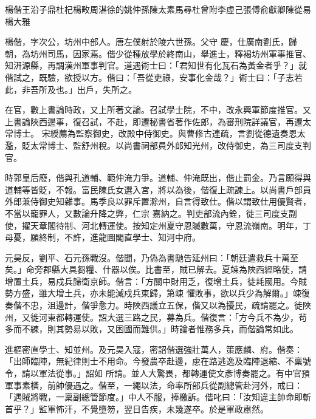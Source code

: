 
\begin{pinyinscope}

 楊偕王沿子鼎杜杞楊畋周湛徐的姚仲孫陳太素馬尋杜曾附李虛己張傅俞獻卿陳從易楊大雅



 楊偕，字次公，坊州中部人。唐左僕射於陵六世孫。父守
 慶，仕廣南劉氏，歸朝，為坊州司馬，因家焉。偕少從種放學於終南山，舉進士，釋褐坊州軍事推官、知汧源縣，再調漢州軍事判官。道遇術士曰：「君知世有化瓦石為黃金者乎？」就偕試之，既驗，欲授以方。偕曰：「吾從吏祿，安事化金哉？」術士曰：「子志若此，非吾所及也。」出戶，失所之。



 在官，數上書論時政，又上所著文論。召試學士院，不中，改永興軍節度推官。又上書論陜西邊事，復召試，不赴，即遷秘書省著作佐郎，為審刑院詳議官，再遷太常博士。
 宋綬薦為監察御史，改殿中侍御史。與曹修古連疏，言劉從德遺奏恩太濫，貶太常博士、監舒州稅。以尚書祠部員外郎知光州，改侍御史，為三司度支判官。



 時郭皇后廢，偕與孔道輔、範仲淹力爭。道輔、仲淹既出，偕止罰金。乃言願得與道輔等皆貶，不報。富民陳氏女選入宮，將以為後，偕復上疏諫上。以尚書戶部員外郎兼侍御史知雜事。馬季良以罪斥置滁州，自言得致仕。偕以謂致仕用優賢者，不當以寵罪人，又數論升降之弊，仁宗
 嘉納之。判吏部流內銓，徙三司度支副使，擢天章閣待制、河北轉運使。按知定州夏守恩贓數萬，守恩流嶺南。明年，丁母憂，願終制，不許，進龍圖閣直學士、知河中府。



 元昊反，劉平、石元孫戰沒。偕聞，乃偽為書馳告延州曰：「朝廷遣救兵十萬至矣。」命旁郡縣大具芻糧、什器以俟。比書至，賊已解去。夏竦為陜西經略使，請增置土兵，易戍兵歸衛京師。偕言：「方關中財用乏，復增土兵，徒耗國用。今賊勢方盛，雖大增土兵，亦未能減戍兵東歸，第竦
 懼敗事，欲以兵少為解爾。」竦復奏偕不忠，沮邊計，偕爭愈力。時陜西議立五保，偕又以為擾民，疏請罷之。徙陜州，又徙河東都轉運使。詔大選三路之民，募為兵。偕復言：「方今兵不為少，茍多而不練，則其勢易以敗，又困國而難供。」時論者惟務多兵，而偕論常如此。



 進樞密直學士、知並州。及元昊入寇，密詔偕選強壯萬人，策應麟、府。偕奏：「出師臨陣，無紀律則士不用命。今發農卒赴邊，慮在路逃逸及臨陣退縮、不稟號令，請以軍法從事。」詔如
 所請。並人大驚畏，都轉運使文彥博奏罷之。有中官預軍事素橫，前帥優遇之。偕至，一繩以法，命率所部兵從副總管赴河外，戒曰：「遇賊將戰，一稟副總管節度。」中人不服，捧檄訴。偕叱曰：「汝知違主帥命即斬首乎？」監軍怖汗，不覺墮笏，翌日告疾，未幾遂卒。於是軍政肅然。




\end{pinyinscope}
